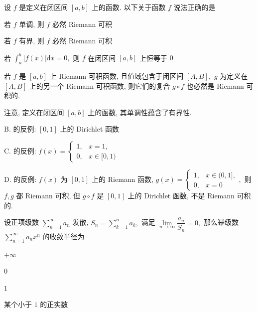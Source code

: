 \begin{question}
  设 $f$ 是定义在闭区间 $[a, b]$ 上的函数. 以下关于函数 $f$ 说法正确的是 \paren[A]

  \begin{choices}
    \item 若 $f$ 单调, 则 $f$ 必然 Riemann 可积
    \item 若 $f$ 有界, 则 $f$ 必然 Riemann 可积
    \item 若 $\int_a^b \lvert f(x) \rvert \mathrm{d} x = 0,$ 则 $f$ 在闭区间 $[a, b]$ 上恒等于 $0$
    \item 若 $f$ 是 $[a, b]$ 上 Riemann 可积函数, 且值域包含于闭区间 $[A, B],$ $g$ 为定义在 $[A, B]$ 上的另一个 Riemann 可积函数, 则它们的复合 $g\circ f$ 也必然是 Riemann 可积的.
  \end{choices}
\end{question}

\begin{solution}
  注意, 定义在闭区间 $[a, b]$ 上的函数, 其单调性蕴含了有界性.

  B. 的反例: $[0, 1]$ 上的 Dirichlet 函数

  C. 的反例: $f(x) = \begin{cases}
    1, & x = 1, \\
    0, & x \in [0, 1)
  \end{cases}$

  D. 的反例: $f(x)$ 为 $[0, 1]$ 上的 Riemann 函数, $g(x) = \begin{cases}
    1, & x \in (0, 1], \\
    0, & x = 0
  \end{cases},$ 则 $f, g$ 都 Riemann 可积, 但 $g\circ f$ 是 $[0, 1]$ 上的 Dirichlet 函数, 不是 Riemann 可积的.
\end{solution}

\begin{question}
  设正项级数 $\sum\limits_{n=1}^{\infty} a_n$ 发散, $S_n = \sum\limits_{k=1}^{n} a_k,$ 满足 $\lim\limits_{n\to\infty} \dfrac{a_n}{S_n} = 0,$ 那么幂级数 $\sum\limits_{n=1}^{\infty} a_n x^n$ 的收敛半径为 \paren[C]

  \begin{choices}
    \item $+\infty$
    \item $0$
    \item $1$
    \item 某个小于 $1$ 的正实数
  \end{choices}
\end{question}

